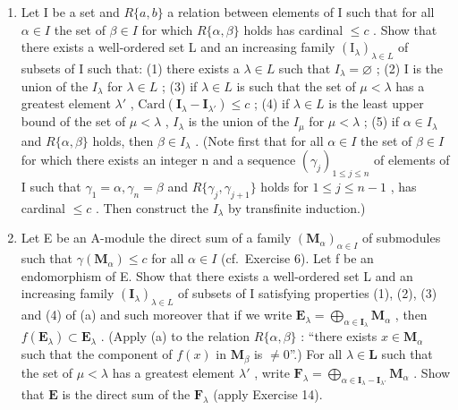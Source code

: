 \begin{enumerate}
\def\labelenumi{(\alph{enumi})}
\item
  Let I be a set and \(R\{a, b\}\) a relation between elements of I such that for all \(\alpha \in I\) the set of \(\beta \in I\) for which \(R\{\alpha, \beta\}\) holds has cardinal \(\leqslant c\) . Show that there exists a well-ordered set L and an increasing family \((\mathrm{I}_{\lambda})_{\lambda \in L}\) of subsets of I such that: (1) there exists a \(\lambda \in L\) such that \(I_{\lambda} = \varnothing\) ; (2) I is the union of the \(I_{\lambda}\) for \(\lambda \in L\) ; (3) if \(\lambda \in L\) is such that the set of \(\mu < \lambda\) has a greatest element \(\lambda'\) , \(\text{Card}(\mathbf{I}_{\lambda} - \mathbf{I}_{\lambda'}) \leqslant c\) ; (4) if \(\lambda \in L\) is the least upper bound of the set of \(\mu < \lambda\) , \(I_{\lambda}\) is the union of the \(I_{\mu}\) for \(\mu < \lambda\) ; (5) if \(\alpha \in I_{\lambda}\) and \(R\{\alpha, \beta\}\) holds, then \(\beta \in I_{\lambda}\) . (Note first that for all \(\alpha \in I\) the set of \(\beta \in I\) for which there exists an integer n and a sequence \((\gamma_{j})_{1 \leqslant j \leqslant n}\) of elements of I such that \(\gamma_{1} = \alpha, \gamma_{n} = \beta\) and \(R\{\gamma_{j}, \gamma_{j+1}\}\) holds for \(1 \leqslant j \leqslant n - 1\) , has cardinal \(\leqslant c\) . Then construct the \(I_{\lambda}\) by transfinite induction.)
\item
  Let E be an A-module the direct sum of a family \((\mathbf{M}_{\alpha})_{\alpha\in I}\) of submodules such that \(\gamma(\mathbf{M}_{\alpha})\leqslant c\) for all \(\alpha\in I\) (cf.~Exercise 6). Let f be an endomorphism of E. Show that there exists a well-ordered set L and an increasing family \((\mathbf{I}_{\lambda})_{\lambda\in L}\) of subsets of I satisfying properties (1), (2), (3) and (4) of (a) and such moreover that if we write \(\mathbf{E}_{\lambda} = \bigoplus_{\alpha \in \mathbf{I}_{\lambda}} \mathbf{M}_{\alpha}\) , then \(f(\mathbf{E}_{\lambda}) \subset \mathbf{E}_{\lambda}\) . (Apply (a) to the relation \(R\{\alpha, \beta\}\) : ``there exists \(x \in \mathbf{M}_{\alpha}\) such that the component of \(f(x)\) in \(\mathbf{M}_{\beta}\) is \(\neq 0\)''.) For all \(\lambda \in \mathbf{L}\) such that the set of \(\mu < \lambda\) has a greatest element \(\lambda'\) , write \(\mathbf{F}_{\lambda} = \bigoplus_{\alpha \in \mathbf{I}_{\lambda} - \mathbf{I}_{\lambda'}} \mathbf{M}_{\alpha}\) . Show that \(\mathbf{E}\) is the direct sum of the \(\mathbf{F}_{\lambda}\) (apply Exercise 14).

\end{enumerate}
